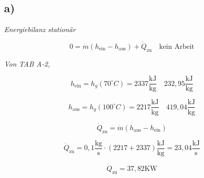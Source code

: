 

\subsection*{a)}
\textit{Energiebilanz stationär}

\[
0 = \dot{m} (h_{\text{ein}} - h_{\text{aus}}) + \dot{Q}_{\text{zu}} \quad \text{kein Arbeit}
\]

\textit{Von TAB A-2,}

\[
h_{\text{ein}} = h_g(70^\circ C) = 2337 \frac{\text{kJ}}{\text{kg}} \quad 232,95 \frac{\text{kJ}}{\text{kg}}
\]

\[
h_{\text{aus}} = h_g(100^\circ C) = 2217 \frac{\text{kJ}}{\text{kg}} \quad 419,04 \frac{\text{kJ}}{\text{kg}}
\]

\[
\dot{Q}_{\text{zu}} = \dot{m} (h_{\text{aus}} - h_{\text{ein}})
\]

\[
\dot{Q}_{\text{zu}} = 0,1 \frac{\text{kg}}{\text{s}} \cdot (2217 + 2337) \frac{\text{kJ}}{\text{kg}} = 23,04 \frac{\text{kJ}}{\text{s}}
\]

\[
\dot{Q}_{\text{zu}} = 37,82 \text{KW}
\]